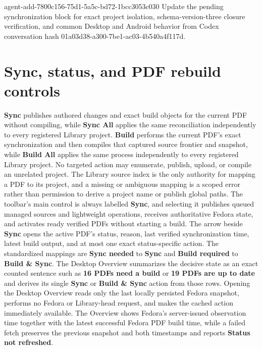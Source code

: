 \agentProposedEdit
  {agent-add-7800c156-75d1-5a5c-bd72-1bcc3053c030}
  {Update the pending synchronization block for exact project isolation, schema-version-three closure verification, and common Desktop and Android behavior from Codex conversation hash 01a03d38-a300-7be1-ac03-4b540a4f117d.}
  {}
  {\section*{Sync, status, and PDF rebuild controls}
\textbf{Sync} publishes authored changes and exact build objects for the current PDF without compiling, while \textbf{Sync All} applies the same reconciliation independently to every registered Library project.
\textbf{Build} performs the current PDF's exact synchronization and then compiles that captured source frontier and snapshot, while \textbf{Build All} applies the same process independently to every registered Library project.
No targeted action may enumerate, publish, upload, or compile an unrelated project.
The Library source index is the only authority for mapping a PDF to its project, and a missing or ambiguous mapping is a scoped error rather than permission to derive a project name or publish global paths.
The toolbar's main control is always labelled \textbf{Sync}, and selecting it publishes queued managed sources and lightweight operations, receives authoritative Fedora state, and activates ready verified PDFs without starting a build.
The arrow beside \textbf{Sync} opens the active PDF's status, reason, last verified synchronization time, latest build output, and at most one exact status-specific action.
The standardized mappings are \textbf{Sync needed} to \textbf{Sync} and \textbf{Build required} to \textbf{Build \& Sync}.
The Desktop Overview summarizes the decisive state as an exact counted sentence such as \textbf{16 PDFs need a build} or \textbf{19 PDFs are up to date} and derives its single \textbf{Sync} or \textbf{Build \& Sync} action from those rows.
Opening the Desktop Overview reads only the last locally persisted Fedora snapshot, performs no Fedora or Library-head request, and makes the cached action immediately available.
The Overview shows Fedora's server-issued observation time together with the latest successful Fedora PDF build time, while a failed fetch preserves the previous snapshot and both timestamps and reports \textbf{Status not refreshed}.
}
